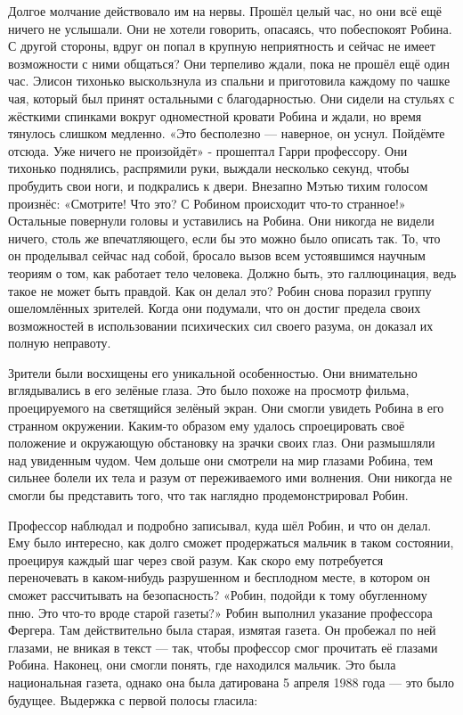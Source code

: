 \documentclass[a4paper,12pt]{book}
\begin{document}
	Долгое молчание действовало им на нервы. Прошёл целый час, но они всё ещё ничего не услышали. Они не хотели говорить, опасаясь, что побеспокоят Робина. С другой стороны, вдруг он попал в крупную неприятность и сейчас не имеет возможности с ними общаться?
	Они терпеливо ждали, пока не прошёл ещё один час. Элисон тихонько выскользнула из спальни и приготовила каждому по чашке чая, который был принят остальными с благодарностью. Они сидели на стульях с жёсткими спинками вокруг одноместной кровати Робина и ждали, но время тянулось слишком медленно.
	«Это бесполезно — наверное, он уснул. Пойдёмте отсюда. Уже ничего не произойдёт» - прошептал Гарри профессору.
	Они тихонько поднялись, распрямили руки, выждали несколько секунд, чтобы пробудить свои ноги, и подкрались к двери. Внезапно Мэтью тихим голосом произнёс:
	«Смотрите! Что это? С Робином происходит что-то странное!»
	Остальные повернули головы и уставились на Робина. Они никогда не видели ничего, столь же впечатляющего, если бы это можно было описать так. То, что он проделывал сейчас над собой, бросало вызов всем устоявшимся научным теориям о том, как работает тело человека. Должно быть, это галлюцинация, ведь такое не может быть правдой. Как он делал это? Робин снова поразил группу ошеломлённых зрителей. Когда они подумали, что он достиг предела своих возможностей в использовании психических сил своего разума, он доказал их полную неправоту.

	Зрители были восхищены его уникальной особенностью. Они внимательно вглядывались в его зелёные глаза. Это было похоже на просмотр фильма, проецируемого на светящийся зелёный экран. Они смогли увидеть Робина в его странном окружении. Каким-то образом ему удалось спроецировать своё положение и окружающую обстановку на зрачки своих глаз. Они размышляли над увиденным чудом. Чем дольше они смотрели на мир глазами Робина, тем сильнее болели их тела и разум от переживаемого ими волнения. Они никогда не смогли бы представить того, что так наглядно продемонстрировал Робин.

	Профессор наблюдал и подробно записывал, куда шёл Робин, и что он делал. Ему было интересно, как долго сможет продержаться мальчик в таком состоянии, проецируя каждый шаг через свой разум. Как скоро ему потребуется переночевать в каком-нибудь разрушенном и бесплодном месте, в котором он сможет рассчитывать на безопасность?
	«Робин, подойди к тому обугленному пню. Это что-то вроде старой газеты?»
	Робин выполнил указание профессора Фергера. Там действительно была старая, измятая газета. Он пробежал по ней глазами, не вникая в текст — так, чтобы профессор смог прочитать её глазами Робина. Наконец, они смогли понять, где находился мальчик. Это была национальная газета, однако она была датирована 5 апреля 1988 года — это было будущее. Выдержка с первой полосы гласила:
\end{document}
